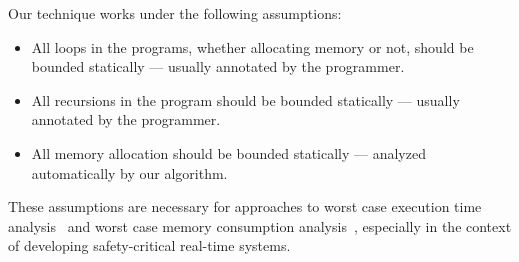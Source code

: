 {\color{red}
  
  Our technique works under the following assumptions:
  \begin{itemize}
  \item All loops in the programs, whether allocating memory or not,
    should be bounded statically --- usually annotated by the
    programmer.
  \item All recursions in the program should be bounded statically ---
    usually annotated by the programmer.
  \item All memory allocation should be bounded statically --- analyzed
    automatically by our algorithm.
  \end{itemize}
  
  These assumptions are necessary for approaches to worst case execution
  time analysis~\cite{jop:wcet:jtres06} and worst case memory
  consumption analysis~\cite{andersen2013worst}, {\color{red} especially
    in the context of developing safety-critical real-time systems.}

}







